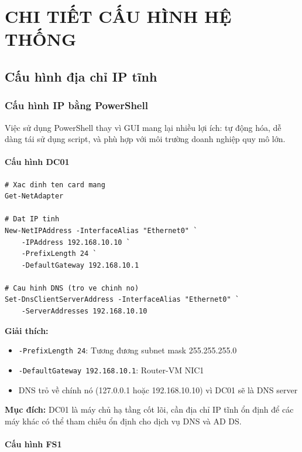 \chapter{CHI TIẾT CẤU HÌNH HỆ THỐNG}

\section{Cấu hình địa chỉ IP tĩnh}

\subsection{Cấu hình IP bằng PowerShell}

Việc sử dụng PowerShell thay vì GUI mang lại nhiều lợi ích: tự động hóa, dễ dàng tái sử dụng script, và phù hợp với môi trường doanh nghiệp quy mô lớn.

\subsubsection{Cấu hình DC01}

\begin{lstlisting}
# Xac dinh ten card mang
Get-NetAdapter

# Dat IP tinh
New-NetIPAddress -InterfaceAlias "Ethernet0" `
    -IPAddress 192.168.10.10 `
    -PrefixLength 24 `
    -DefaultGateway 192.168.10.1

# Cau hinh DNS (tro ve chinh no)
Set-DnsClientServerAddress -InterfaceAlias "Ethernet0" `
    -ServerAddresses 192.168.10.10
\end{lstlisting}

\textbf{Giải thích:}
\begin{itemize}
    \item \texttt{-PrefixLength 24}: Tương đương subnet mask 255.255.255.0
    \item \texttt{-DefaultGateway 192.168.10.1}: Router-VM NIC1
    \item DNS trỏ về chính nó (127.0.0.1 hoặc 192.168.10.10) vì DC01 sẽ là DNS server
\end{itemize}

\textbf{Mục đích:} DC01 là máy chủ hạ tầng cốt lõi, cần địa chỉ IP tĩnh ổn định để các máy khác có thể tham chiếu ổn định cho dịch vụ DNS và AD DS.

\subsubsection{Cấu hình FS1}

